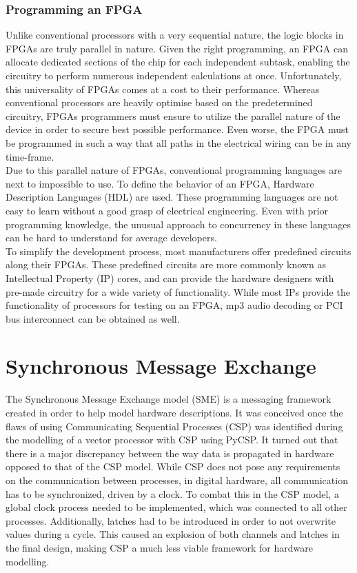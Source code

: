 \subsubsection{Programming an FPGA}
Unlike conventional processors with a very sequential nature, the logic blocks
in FPGAs are truly parallel in nature. Given the right programming, an FPGA can
allocate dedicated sections of the chip for each independent subtask, enabling
the circuitry to perform numerous independent calculations at once\cite{ni_fpga}.
Unfortunately, this universality of FPGAs comes at a cost to their performance.
Whereas conventional processors are heavily optimise based on the predetermined
circuitry, FPGAs programmers must ensure to utilize the parallel nature of the
device in order to secure best possible performance. Even worse, the FPGA must
be programmed in such a way that all paths in the electrical wiring can be
in any time-frame.\\
Due to this parallel nature of FPGAs, conventional programming languages are
next to impossible to use. To define the behavior of an FPGA, Hardware
Description Languages (HDL) are used. These programming languages are not easy
to learn without a good grasp of electrical engineering. Even with prior
programming knowledge, the unusual approach to concurrency in these languages
can be hard to understand for average developers.\\
To simplify the development process, most manufacturers offer predefined
circuits along their FPGAs. These predefined circuits are more commonly known
as Intellectual Property (IP) cores, and can provide the hardware designers
with pre-made circuitry for a wide variety of functionality. While most IPs
provide the functionality of processors for testing on an FPGA, mp3 audio
decoding or PCI bus interconnect can be obtained as well\cite{fpga_for_dummies}.



\section{Synchronous Message Exchange}
The Synchronous Message Exchange
model (SME) is a messaging framework created in order to help model
hardware descriptions\cite{sme_for_hardware_designs}.  It was conceived
once the flaws of using Communicating Sequential Processes (CSP) was
identified during the modelling of a vector processor with CSP using
PyCSP\cite{PyCSP}.  It turned out that there is a major discrepancy
between the way data is propagated in hardware opposed to that of the
CSP model. While CSP does not pose any requirements on the communication
between processes, in digital hardware, all communication has to be
synchronized, driven by a clock. To combat this in the CSP model, a
global clock process needed to be implemented, which was connected to
all other processes. Additionally, latches had to be introduced in order
to not overwrite values during a cycle. This caused an explosion of both
channels and latches in the final design, making CSP a much less viable
framework for hardware modelling\cite{sme_for_hardware_designs}.

